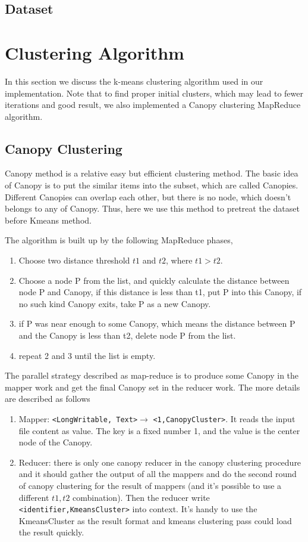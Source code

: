 \documentclass[a4paper,11pt]{article}
\begin{document}
\subsection{Dataset}

\section{Clustering Algorithm}
In this section we discuss the k-means clustering algorithm used in our
implementation. Note that to find proper initial clusters, which may lead to
fewer iterations and good result, we also implemented a Canopy clustering
MapReduce algorithm.
\subsection{Canopy Clustering}
Canopy method is a relative easy but efficient clustering method. The basic 
idea of Canopy is to put the similar items into the subset, which are called 
Canopies. Different Canopies can overlap each other, but there is no node, 
which doesn't belongs to any of Canopy. Thus, here we use this method to 
pretreat the dataset before Kmeans method. 

The algorithm is built up by the following MapReduce phases,
\begin{enumerate}
  \item Choose two distance threshold $t1$ and $t2$, where $t1>t2$.	
  \item Choose a node P from the list, and quickly calculate the distance
  between node P and Canopy, if this distance is less than t1, put P into this
  Canopy, if no such kind Canopy exits, take P as a new Canopy.
  \item if P was near enough to some Canopy, which means the distance
  between P and the Canopy is less than t2, delete node P from the list.
  \item repeat 2 and 3 until the list is empty.
\end{enumerate}
The parallel strategy described as map-reduce is to produce some Canopy in the
mapper work and get the final Canopy set in the reducer work. The more details
are described as follows

\begin{enumerate}
    \item Mapper: \verb|<LongWritable, Text>|$\rightarrow$
        \verb|<1,CanopyCluster>|. It reads the input file content as
        value. The key is a fixed number 1, and the value is the center
        node of the Canopy.
    \item Reducer: there is only one canopy reducer in the canopy clustering 
        procedure and it should gather the output of all the mappers and do 
        the second round of canopy clustering for the result of mappers (and 
        it's possible to use a different $t1,t2$ combination).
        Then the reducer write \verb|<identifier,KmeansCluster>| into context.
        It's handy to use the KmeansCluster as the result format and kmeans 
        clustering pass could load the result quickly.
\end{enumerate}
\end{document}
